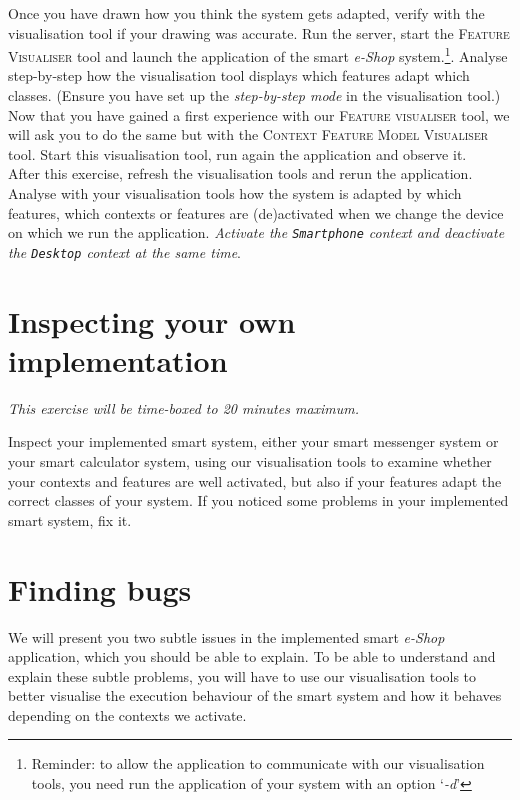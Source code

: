 \documentclass{article}
\begin{document}
Once you have drawn how you think the system gets adapted, verify with the visualisation tool if your drawing was accurate. Run the server, start the \textsc{Feature Visualiser} tool and launch the application of the smart \emph{e-Shop} system.\footnote{Reminder: to allow the application to communicate with our visualisation tools, you need run the application of your system with an option `\emph{-d}'}. Analyse step-by-step how the visualisation tool displays which features adapt which classes. (Ensure you have set up the \emph{step-by-step mode} in the visualisation tool.)\\

Now that you have gained a first experience with our \textsc{Feature visualiser} tool, we will ask you to do the same but with the \textsc{Context Feature Model Visualiser} tool. Start this visualisation tool, run again the application and observe it.\\
After this exercise, refresh the visualisation tools and rerun the application. Analyse with your visualisation tools how the system is adapted by which features, which contexts or features are (de)activated when we change the device on which we run the application. \emph{Activate the \texttt{Smartphone} context and deactivate the \texttt{Desktop} context at the same time}.

\section{Inspecting your own implementation}

\begin{flushright}
\emph{This exercise will be time-boxed to 20 minutes maximum.}
\end{flushright}

Inspect your implemented smart system, either your smart messenger system or your smart calculator system, using our visualisation tools to examine whether your contexts and features are well activated, but also if your features adapt the correct classes of your system. If you noticed some problems in your implemented smart system, fix it.

\section{Finding bugs}

We will present you two subtle issues in the implemented smart \emph{e-Shop} application, which you should be able to explain.
To be able to understand and explain these subtle problems, you will have to use our visualisation tools to better visualise the execution behaviour of the smart system and how it behaves depending on the contexts we activate.
\end{document}
